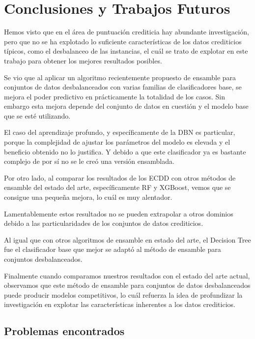 \chapter{Conclusiones y Trabajos Futuros}\label{chap:conclusiones}


Hemos visto que en el área de puntuación crediticia hay abundante investigación, pero que no se ha explotado lo suficiente características de los datos crediticios típicos, como el desbalanceo de las instancias, el cuál se trato de explotar en este trabajo para obtener los mejores resultados posibles.

Se vio que al aplicar un algoritmo recientemente propuesto de ensamble para conjuntos de datos desbalanceados con varias familias de clasificadores base, se mejora el poder predictivo en prácticamente la totalidad de los casos. Sin embargo esta mejora depende del conjunto de datos en cuestión y el modelo base que se esté utilizando.

El caso del aprendizaje profundo, y específicamente de la \ac{DBN} es particular, porque la complejidad de ajustar los parámetros del modelo es elevada y el beneficio obtenido no lo justifica. Y debido a que este clasificador ya es bastante complejo de por sí no se le creó una versión ensamblada.

Por otro lado, al comparar los resultados de los \ac{ECDD} con otros métodos de ensamble del estado del arte, específicamente \ac{RF} y \ac{XGBoost}, vemos que se consigue una pequeña mejora, lo cuál es muy alentador.

Lamentablemente estos resultados no se pueden extrapolar a otros dominios debido a las particularidades de los conjuntos de datos crediticios.

Al igual que con otros algoritmos de ensamble en estado del arte, el Decision Tree fue el clasificador base que mejor se adaptó al método de ensamble para conjuntos desbalanceados.

Finalmente cuando comparamos nuestros resultados con el estado del arte actual, observamos que este método de ensamble para conjuntos de datos desbalanceados puede producir modelos competitivos, lo cuál refuerza la idea de profundizar la investigación en explotar las características inherentes a los datos crediticios.

\section{Problemas encontrados}


